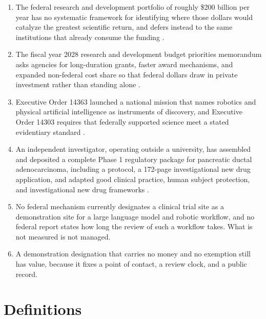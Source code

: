 \begin{enumerate}
\item The federal research and development portfolio of roughly \$200 billion
  per year has no systematic framework for identifying where those dollars
  would catalyze the greatest scientific return, and defers instead to the same
  institutions that already consume the funding
  \cite{kratsios2026sciencegoldenage}.

\item The fiscal year 2028 research and development budget priorities
  memorandum asks agencies for long-duration grants, faster award mechanisms,
  and expanded non-federal cost share so that federal dollars draw in private
  investment rather than standing alone
  \cite{kratsiosvought2026fy2028priorities}.

\item Executive Order 14363 launched a national mission that names robotics and
  physical artificial intelligence as instruments of discovery, and Executive
  Order 14303 requires that federally supported science meet a stated evidentiary
  standard \cite{eo14363genesismission,eo14303goldstandard}.

\item An independent investigator, operating outside a university, has
  assembled and deposited a complete Phase 1 regulatory package for pancreatic
  ductal adenocarcinoma, including a protocol, a 172-page investigational new
  drug application, and adapted good clinical practice, human subject
  protection, and investigational new drug frameworks
  \cite{phase1protocol,indapp,iche6r3adapt,cfr50adapt,cfr312adapt}.

\item No federal mechanism currently designates a clinical trial site as a
  demonstration site for a large language model and robotic workflow, and no
  federal report states how long the review of such a workflow takes. What is
  not measured is not managed.

\item A demonstration designation that carries no money and no exemption still
  has value, because it fixes a point of contact, a review clock, and a public
  record.
\end{enumerate}

\section{Definitions}

